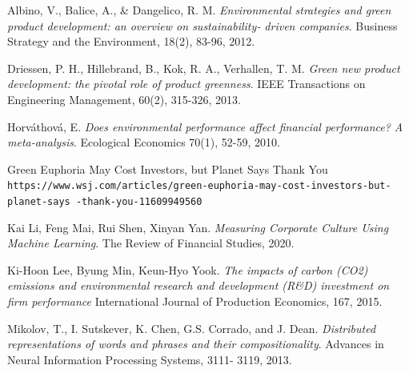 \documentclass[10pt]{article}
\begin{document}
\begin{thebibliography}{9}


Albino, V., Balice, A., & Dangelico, R. M.
\textit{Environmental strategies and
green product development: an overview on sustainability‐ driven companies}. 
Business Strategy and the Environment, 18(2), 83-96, 2012.

Driessen, P. H., Hillebrand, B., Kok, R. A., Verhallen, T. M.
\textit{Green new
product development: the pivotal role of product greenness}. 
IEEE Transactions on
Engineering Management, 60(2), 315-326, 2013.

Horváthová, E.
\textit{Does environmental performance affect financial performance? A meta-analysis}.
Ecological Economics 70(1), 52-59, 2010.


 Green Euphoria May Cost Investors, but Planet Says Thank You 
\\\texttt{https://www.wsj.com/articles/green-euphoria-may-cost-investors-but-planet-says\
-thank-you-11609949560}



Kai Li, Feng Mai, Rui Shen, Xinyan Yan. 
\textit{Measuring Corporate Culture Using Machine Learning}. 
The Review of Financial Studies, 2020.


Ki-Hoon Lee, Byung Min, Keun-Hyo Yook. 
\textit{The impacts of carbon (CO2) emissions and environmental research and development (R\&D) investment on firm performance}
International Journal of Production Economics, 167, 2015.


Mikolov, T., I. Sutskever, K. Chen, G.S. Corrado, and J. Dean. 
\textit{Distributed representations of words
and phrases and their compositionality}. 
Advances in Neural Information Processing Systems, 3111-
3119, 2013.



\end{thebibliography}
\end{document}
